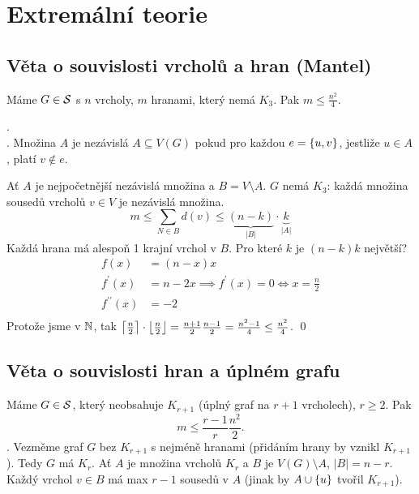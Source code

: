 \section{Extremální teorie}
\subsection{Věta o souvislosti vrcholů a hran (Mantel)}
Máme $G \in \S$ s $n$ vrcholy, $m$ hranami, který nemá $K_3$. Pak $m \leq \frac{n^2}{4}$.

.\\
. Množina $A$ je nezávislá $A \subseteq V(G)$ pokud pro každou $e = \bc{u, v}$, jestliže $u \in A$, platí 
$v \not\in e$. 

Ať $A$ je nejpočetnější nezávislá množina a $B = V \setminus A$. $G$ nemá $K_3$: každá množina sousedů vrcholů $v \in V$
je nezávislá množina.
\begin{equation}
    m \leq \sum_{N \in B}d(v) \leq \underbrace{(n-k)}_{|B|} \cdot \underbrace{k}_{|A|}
\end{equation}
Každá hrana má alespoň 1 krajní vrchol v $B$. Pro které $k$ je $(n-k)k$ největší?
\begin{align*}
    f(x) &= (n-x)x\\
    f^\prime(x) &= n-2x \implies f^\prime(x) = 0 \iff x = \frac{n}{2}\\
    f^{\prime \prime}(x) &= -2\\
\end{align*}
Protože jsme v $\N$, tak $\ceil*{\frac{n}{2}} \cdot \floor*{\frac{n}{2}} = \frac{n+1}{2} \frac{n-1}{2} = \frac{n^2-1}{4} 
\leq \frac{n^2}{4}$.
\hspace{\fill}\qed

\subsection{Věta o souvislosti hran a úplném grafu}
Máme $G \in \S$, který neobsahuje $K_{r+1}$ (úplný graf na $r+1$ vrcholech), $r \geq 2$. Pak
\begin{equation}
    m \leq \frac{r-1}{r} \frac{n^2}{2}.
\end{equation}
. Vezměme graf $G$ bez $K_{r+1}$ s nejméně hranami (přidáním hrany by vznikl $K_{r+1}$). Tedy $G$ má $K_r$.
Ať $A$ je množina vrcholů $K_r$ a $B$ je $V(G) \setminus A$, $|B| = n -r$. Každý vrchol $v \in B$ má max $r-1$ sousedů v
$A$ (jinak by $A \cup \bc{u}$ tvořil $K_{r+1}$).

